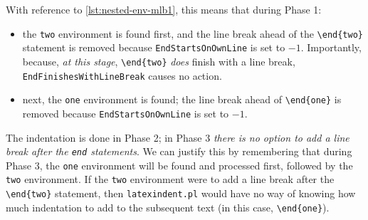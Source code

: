 \documentclass[10pt]{article}
\begin{document}
 With reference to \cref{lst:nested-env-mlb1}, this means that during Phase 1:
 \begin{itemize}
  \item the \texttt{two} environment is found first, and the line break ahead of the
        \lstinline!\end{two}! statement is removed because \texttt{EndStartsOnOwnLine} is
        set to $-1$. Importantly, because, \emph{at this stage}, \lstinline!\end{two}!
        \emph{does} finish with a line break, \texttt{EndFinishesWithLineBreak} causes no
        action.
  \item next, the \texttt{one} environment is found; the line break ahead of
        \lstinline!\end{one}! is removed because \texttt{EndStartsOnOwnLine} is set to
        $-1$.
 \end{itemize}
 The indentation is done in Phase 2; in Phase 3 \emph{there is no option to add a line
 break after the \lstinline!end! statements}. We can justify this by remembering that
 during Phase 3, the \texttt{one} environment will be found and processed first, followed
 by the \texttt{two} environment. If the \texttt{two} environment were to add a line
 break after the \lstinline!\end{two}! statement, then \texttt{latexindent.pl} would have
 no way of knowing how much indentation to add to the subsequent text (in this case,
 \lstinline!\end{one}!).
\end{document}
